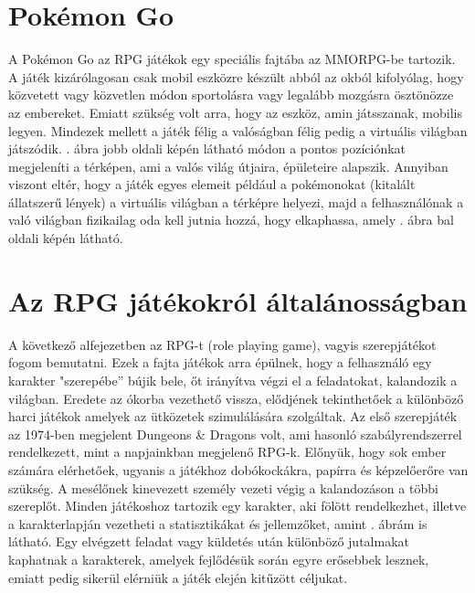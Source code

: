 \section*{Pokémon Go}
\label{pokemongo}

A Pokémon Go az RPG játékok egy speciális fajtába az MMORPG-be tartozik. 
A játék kizárólagosan csak mobil eszközre készült abból az okból kifolyólag, hogy közvetett vagy közvetlen módon sportolásra vagy legalább mozgásra ösztönözze az embereket. 
Emiatt szükség volt arra, hogy az eszköz, amin játsszanak, mobilis legyen. 
Mindezek mellett a játék félig a valóságban félig pedig a virtuális világban játszódik. 
. ábra jobb oldali képén látható módon a pontos pozíciónkat megjeleníti a térképen, ami a valós világ útjaira, épületeire alapszik. 
Annyiban viszont eltér, hogy a játék egyes elemeit például a pokémonokat (kitalált állatszerű lények) a virtuális világban a térképre helyezi, majd a felhasználónak a való világban fizikailag oda kell jutnia hozzá, hogy elkaphassa, amely . ábra bal oldali képén látható. 


\section{Az RPG játékokról általánosságban}
\label{rpgaltalanos}

A következő alfejezetben az RPG-t (role playing game), vagyis szerepjátékot fogom bemutatni. 
Ezek a fajta játékok arra épülnek, hogy a felhasználó egy karakter "szerepébe” bújik bele, őt irányítva végzi el a feladatokat, kalandozik a világban. 
Eredete az ókorba vezethető vissza, elődjének tekinthetőek a különböző harci játékok amelyek az ütközetek szimulálására szolgáltak. 
Az első szerepjáték az 1974-ben megjelent Dungeons \& Dragons volt, ami hasonló szabályrendszerrel rendelkezett, mint a napjainkban megjelenő RPG-k. 
Előnyük, hogy sok ember számára elérhetőek, ugyanis a játékhoz dobókockákra, papírra és képzelőerőre van szükség. 
A mesélőnek kinevezett személy vezeti végig a kalandozáson a többi szereplőt. 
Minden játékoshoz tartozik egy karakter, aki fölött rendelkezhet, illetve a karakterlapján vezetheti a statisztikákat és jellemzőket, amint . ábrám is látható. 
Egy elvégzett feladat vagy küldetés után különböző jutalmakat kaphatnak a karakterek, amelyek fejlődésük során egyre erősebbek lesznek, emiatt pedig sikerül elérniük a játék elején kitűzött céljukat. 

